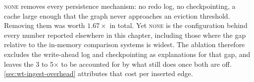 \textsc{none} removes every persistence mechanism: no redo log, no checkpointing, a cache large enough that the graph never approaches an eviction threshold. Removing them was worth $1.67\times$ in total. Yet \textsc{none} is the configuration behind every \project{} number reported elsewhere in this chapter, including those where the gap relative to the in-memory comparison systems is widest. The ablation therefore excludes the write-ahead log and checkpointing as explanations for that gap, and leaves the 3 to 5$\times$ to be accounted for by what \wt{} still does once both are off. \autoref{sec:wt-ingest-overhead} attributes that cost per inserted edge.
